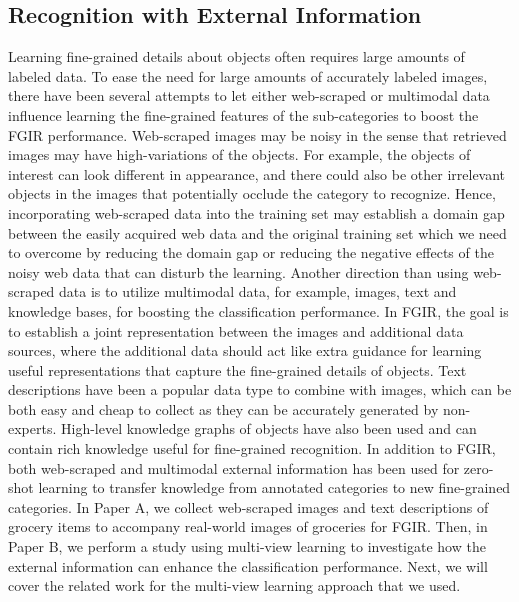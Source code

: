 \subsection{Recognition with External Information}
Learning fine-grained details about objects often requires large amounts of labeled data. To ease the need for large amounts of accurately labeled images, there have been several attempts to let either web-scraped or multimodal data influence learning the fine-grained features of the sub-categories to boost the FGIR performance. Web-scraped images may be noisy in the sense that retrieved images may have high-variations of the objects. For example, the objects of interest can look different in appearance, and there could also be other irrelevant objects in the images that potentially occlude the category to recognize. Hence, incorporating web-scraped data into the training set may establish a domain gap between the easily acquired web data and the original training set which we need to overcome by reducing the domain gap or reducing the negative effects of the noisy web data that can disturb the learning. Another direction than using web-scraped data is to utilize multimodal data, for example, images, text and knowledge bases, for boosting the classification performance. In FGIR, the goal is to establish a joint representation between the images and additional data sources, where the additional data should act like extra guidance for learning useful representations that capture the fine-grained details of objects. Text descriptions have been a popular data type to combine with images, which can be both easy and cheap to collect as they can be accurately generated by non-experts. High-level knowledge graphs of objects have also been used and can contain rich knowledge useful for fine-grained recognition. In addition to FGIR, both web-scraped and multimodal external information has been used for zero-shot learning to transfer knowledge from annotated categories to new fine-grained categories. In Paper A, we collect web-scraped images and text descriptions of grocery items to accompany real-world images of groceries for FGIR. Then, in Paper B, we perform a study using multi-view learning to investigate how the external information can enhance the classification performance. Next, we will cover the related work for the multi-view learning approach that we used. 


